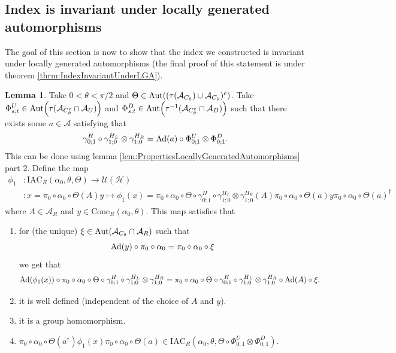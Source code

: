 \documentclass[12pt,a4paper,twoside]{article}
\let\originalleft\left
\let\originalright\right
\renewcommand{\left}{\mathopen{}\mathclose\bgroup\originalleft}
\renewcommand{\right}{\aftergroup\egroup\originalright}
\newcommand{\UU}{\mathcal U}
\newcommand{\HH}{\mathcal H}
\renewcommand{\AA}{\mathcal A}
\newcommand{\Ad}[1]{\textrm{Ad}\left(#1\right)}
\newcommand{\Aut}[1]{\textrm{Aut}\left(#1\right)}
\theoremstyle{definition}
\newtheorem{lemma}[theorem]{Lemma}
\numberwithin{equation}{section}
\begin{document}
\subsection{Index is invariant under locally generated automorphisms}\label{sec:IndexInvariantUnderLGA}
The goal of this section is now to show that the index we constructed is invariant under locally generated automorphisms (the final proof of this statement is under theorem \ref{thrm:IndexInvariantUnderLGA}).
\begin{lemma}\label{lem:DefinitionOfGroupMorphism}
	Take $0<\theta<\pi/2$ and $\Theta\in \Aut{(\tau(\AA_{C_\theta})\cup\AA_{C_\theta})^c}$. Take $\Phi^U_{s;t}\in\Aut{\tau(\AA_{C_\theta^c}\cap\AA_{U})}$ and $\Phi^D_{s;t}\in\Aut{\tau^{-1}(\AA_{C_\theta^c}\cap\AA_{D})}$ such that there exists some $a\in\AA$ satisfying that
	\begin{equation}\label{eq:DefinitionOfGroupMorphismHAutEquation}
		\gamma^H_{0;1}\circ\gamma^{H_L}_{1;0}\otimes\gamma^{H_R}_{1;0}=\Ad{a}\circ \Phi^U_{0;1}\otimes\Phi^D_{0;1}.
	\end{equation}
	This can be done using lemma \ref{lem:PropertiesLocallyGeneratedAutomorphisms} part 2. Define the map
	\begin{align}
		\phi_1&:\textrm{IAC}_R(\alpha_0,\theta,\Theta) \rightarrow \UU(\HH)\\
		\nonumber
		&:x=\pi_0\circ\alpha_0\circ\Theta(A)y\mapsto \phi_1(x)=\pi_0\circ\alpha_0\circ\Theta\circ\gamma^H_{0;1}\circ\gamma^{H_L}_{1;0}\otimes\gamma^{H_R}_{1;0}(A)\pi_0\circ\alpha_0\circ\Theta(a)y\pi_0\circ\alpha_0\circ\Theta(a)^\dagger
	\end{align}
	where $A\in\AA_R$ and $y\in\textrm{Cone}_R(\alpha_0,\theta)$. This map satisfies that
	\begin{enumerate}
		\item  for (the unique) $\xi\in\Aut{\AA_{C_\theta}\cap\AA_R}$ such that
		\begin{equation}
			\Ad{y}\circ\pi_0\circ\alpha_0=\pi_0\circ\alpha_0\circ\xi
		\end{equation}
		we get that
		\begin{equation}\label{eq:ConditionDefinitionOfGroupMorphism}
			\Ad{\phi_1(x)}\circ\pi_0\circ\alpha_0\circ\Theta\circ\gamma^H_{0;1}\circ\gamma^{H_L}_{1;0}\otimes\gamma^{H_R}_{1;0}=\pi_0\circ\alpha_0\circ\Theta\circ\gamma^H_{0;1}\circ\gamma^{H_L}_{1;0}\otimes\gamma^{H_R}_{1;0}\circ\Ad{A}\circ\xi.
		\end{equation}
		\item it is well defined (independent of the choice of $A$ and $y$).
		\item it is a group homomorphism.
		\item $\pi_0\circ\alpha_0\circ\Theta(a^\dagger)\phi_1(x)\pi_0\circ\alpha_0\circ\Theta(a)\in\textrm{IAC}_R(\alpha_0,\theta,\Theta\circ \Phi^U_{0;1}\otimes\Phi^D_{0;1})$.
	\end{enumerate}
\end{lemma}
\end{document}
